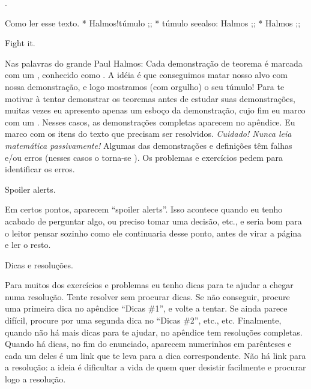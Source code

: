 
\chapblah \prefaceterm.

\secblah Como ler esse texto.
  * Halmos!túmulo
  ;;
\indexes
  * túmulo    seealso: Halmos
  ;;
\credits
  * Halmos
  ;;

\blah Fight it.

Nas palavras do grande Paul Halmos:
\spoken
{}
\endspoken
Cada demonstração de teorema é marcada com um \symq{$\qedsymbol$},
conhecido como .\foot
A idéia é que conseguimos matar nosso alvo com nossa demonstração,
e logo mostramos (com orgulho) o seu túmulo!
\toof
Para te motivar à tentar demonstrar os teoremas antes de estudar suas demonstrações,
muitas vezes eu apresento apenas um esboço da demonstração,
cujo fim eu marco com um \symq{$\qessymbol$}.
Nesses casos, as demonstrações completas aparecem no apêndice.
Eu marco com \symq{\activitysymbol} os itens do texto que
precisam ser resolvidos.
\endgraf
\emph{Cuidado! Nunca leia matemática passivamente!}
Algumas das demonstrações e definições têm falhas e/ou erros
(nesses casos o \symq{$\qedsymbol$} torna-se \symq{$\mistakesymbol$}).
Os problemas e exercícios pedem para identificar os erros.


\blah Spoiler alerts.

Em certos pontos, aparecem ``spoiler alerts''.
Isso acontece quando eu tenho acabado de perguntar algo, ou preciso
tomar uma decisão, etc., e seria bom para o leitor pensar sozinho
como ele continuaria desse ponto, antes de virar a página
e ler o resto.


\blah Dicas e resoluções.

Para muitos dos exercícios e problemas eu tenho dicas para te ajudar a
chegar numa resolução.  Tente resolver sem procurar dicas.
Se não conseguir, procure uma primeira dica no apêndice ``Dicas \#1'',
e volte a tentar.
Se ainda parece difícil, procure por uma segunda dica no ``Dicas \#2'', etc., etc.
Finalmente, quando não há mais dicas para te ajudar,
no apêndice tem resoluções completas.
Quando há dicas, no fim do enunciado, aparecem numerinhos em parênteses
e cada um deles é um link que te leva para a dica correspondente.
Não há link para a resolução: a ideia é dificultar a vida de quem
quer desistir facilmente e procurar logo a resolução.

